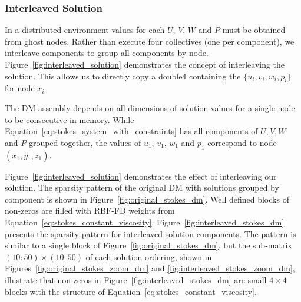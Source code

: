 \subsubsection{Interleaved Solution}

In a distributed environment values for each $U$, $V$, $W$ and $P$ must be obtained from ghost nodes. Rather than execute four collectives (one per component), we interleave components to group all components by node. Figure~\ref{fig:interleaved_solution} demonstrates the concept of interleaving the solution. This allows us to directly copy a double4 containing the $\{u_i, v_i, w_i, p_i\}$ for node $x_i$

The DM assembly depends on all dimensions of solution values for a single node to be consecutive in memory. While Equation~\ref{eq:stokes_system_with_constraints} has all components of $U, V, W$ and $P$ grouped together, the values of $u_1$, $v_1$, $w_1$ and $p_1$ correspond to node $(x_1, y_1, z_1)$. 

Figure~\ref{fig:interleaved_solution} demonstrates the effect of interleaving our solution. The sparsity pattern of the original DM with solutions grouped by component is shown in Figure~\ref{fig:original_stokes_dm}. Well defined blocks of non-zeros are filled with RBF-FD weights from Equation~\ref{eq:stokes_constant_viscosity}. Figure~\ref{fig:interleaved_stokes_dm} presents the sparsity pattern for interleaved solution components. The pattern is similar to a single block of Figure~\ref{fig:original_stokes_dm}, but the sub-matrix $(10:50)\times(10:50)$ of each solution ordering, shown in Figures~\ref{fig:original_stokes_zoom_dm} and \ref{fig:interleaved_stokes_zoom_dm}, illustrate that non-zeros in Figure~\ref{fig:interleaved_stokes_dm} are small $4\times4$ blocks with the structure of Equation~\ref{eq:stokes_constant_viscosity}.

